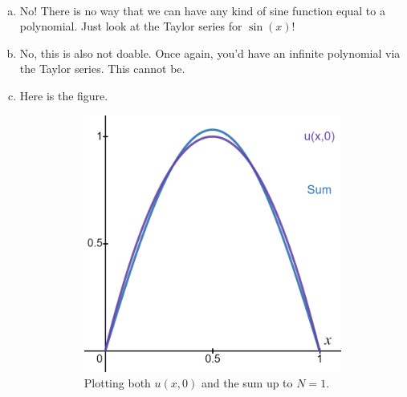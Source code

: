 \documentclass[12pt]{article} %
\begin{document}
\begin{solution}~
\begin{enumerate}[(a)]
    \item No! There is no way that we can have any kind of sine function equal to a polynomial. Just look at the Taylor series for $\sin(x)$!
    \item No, this is also not doable. Once again, you'd have an infinite polynomial via the Taylor series. This cannot be.
    \item Here is the figure.
    \begin{figure}[H]
\centering
    \begin{subfigure}[b]{0.3\textwidth}
        \centering
        \includegraphics[width=\textwidth]{figures/sum_n1.png}
        \caption{Plotting both $u(x,0)$ and the sum up to $N=1$.}
    \end{subfigure}
    \hfill
    \begin{subfigure}[b]{0.3\textwidth}
        \centering

\end{subfigure}
\end{figure}
\end{enumerate}
\end{solution}
\end{document}
